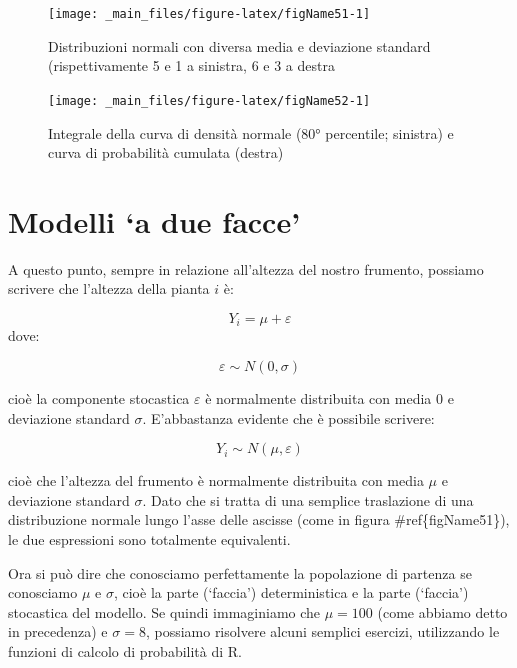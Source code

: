 \documentclass[a4paper,12pt,oneside]{book}
\theoremstyle{definition}
\theoremstyle{definition}
\theoremstyle{definition}
\theoremstyle{remark}
\begin{document}
\begin{figure}

{\centering \texttt{[image: \_main\_files/figure-latex/figName51-1]} 

}

\caption{Distribuzioni normali con diversa media e deviazione standard (rispettivamente 5 e 1 a sinistra, 6 e 3 a destra}\label{fig:figName51}
\end{figure}

\begin{figure}

{\centering \texttt{[image: \_main\_files/figure-latex/figName52-1]} 

}

\caption{Integrale della curva di densità normale (80° percentile; sinistra) e curva di probabilità cumulata (destra)}\label{fig:figName52}
\end{figure}

\section{\texorpdfstring{Modelli `a due
facce'}{Modelli a due facce}}\label{modelli-a-due-facce}

A questo punto, sempre in relazione all'altezza del nostro frumento,
possiamo scrivere che l'altezza della pianta \(i\) è:

\[Y_i = \mu + \varepsilon\] dove:

\[ \varepsilon \sim N(0, \sigma) \]

cioè la componente stocastica \(\varepsilon\) è normalmente distribuita
con media 0 e deviazione standard \(\sigma\). E'abbastanza evidente che
è possibile scrivere:

\[Y_i \sim N(\mu, \varepsilon)\]

cioè che l'altezza del frumento è normalmente distribuita con media
\(\mu\) e deviazione standard \(\sigma\). Dato che si tratta di una
semplice traslazione di una distribuzione normale lungo l'asse delle
ascisse (come in figura \#ref\{figName51\}), le due espressioni sono
totalmente equivalenti.

Ora si può dire che conosciamo perfettamente la popolazione di partenza
se conosciamo \(\mu\) e \(\sigma\), cioè la parte (`faccia')
deterministica e la parte (`faccia') stocastica del modello. Se quindi
immaginiamo che \(\mu = 100\) (come abbiamo detto in precedenza) e
\(\sigma = 8\), possiamo risolvere alcuni semplici esercizi, utilizzando
le funzioni di calcolo di probabilità di R.
\end{document}
